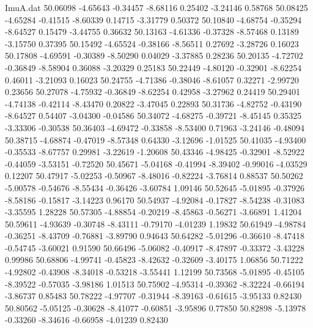 \begin{filecontents}{ImuA.dat}
  50.06098   -4.65643   -0.34457   -8.68116    0.25402   -3.24146    0.58768
  50.08425   -4.65284   -0.41515   -8.60339    0.14715   -3.31779    0.50372
  50.10840   -4.68754   -0.35294   -8.64527    0.15479   -3.44755    0.36632
  50.13163   -4.61336   -0.37328   -8.57468    0.13189   -3.15750    0.37395
  50.15492   -4.65524   -0.38166   -8.56511    0.27692   -3.28726    0.16023
  50.17808   -4.69591   -0.30389   -8.50290    0.04029   -3.37885    0.28236
  50.20135   -4.72702   -0.36849   -8.58904    0.36088   -3.20329    0.25183
  50.22449   -4.80120   -0.32901   -8.62254    0.46011   -3.21093    0.16023
  50.24755   -4.71386   -0.38046   -8.61057    0.32271   -2.99720    0.23656
  50.27078   -4.75932   -0.36849   -8.62254    0.42958   -3.27962    0.24419
  50.29401   -4.74138   -0.42114   -8.43470    0.20822   -3.47045    0.22893
  50.31736   -4.82752   -0.43190   -8.64527    0.54407   -3.04300   -0.04586
  50.34072   -4.68275   -0.39721   -8.45145    0.35325   -3.33306   -0.30538
  50.36403   -4.69472   -0.33858   -8.53400    0.71963   -3.24146   -0.48094
  50.38715   -4.68874   -0.47019   -8.57348    0.64330   -3.12696   -1.01525
  50.41035   -4.93400   -0.35533   -8.67757    0.29981   -3.22619   -1.20608
  50.43346   -4.98425   -0.32901   -8.52922   -0.44059   -3.53151   -0.72520
  50.45671   -5.04168   -0.41994   -8.39402   -0.99016   -4.03529    0.12207
  50.47917   -5.02253   -0.50967   -8.48016   -0.82224   -3.76814    0.88537
  50.50262   -5.00578   -0.54676   -8.55434   -0.36426   -3.60784    1.09146
  50.52645   -5.01895   -0.37926   -8.58186   -0.15817   -3.14223    0.96170
  50.54937   -4.92084   -0.17827   -8.54238   -0.31083   -3.35595    1.28228
  50.57305   -4.88854   -0.20219   -8.45863   -0.56271   -3.66891    1.41204
  50.59611   -4.93639   -0.30748   -8.43111   -0.79170   -4.01239    1.19832
  50.61949   -4.98784   -0.36251   -8.43709   -0.76881   -3.89790    0.94643
  50.64282   -5.01296   -0.36610   -8.47418   -0.54745   -3.60021    0.91590
  50.66496   -5.06082   -0.40917   -8.47897   -0.33372   -3.43228    0.99986
  50.68806   -4.99741   -0.45823   -8.42632   -0.32609   -3.40175    1.06856
  50.71222   -4.92802   -0.43908   -8.34018   -0.53218   -3.55441    1.12199
  50.73568   -5.01895   -0.45105   -8.39522   -0.57035   -3.98186    1.01513
  50.75902   -4.95314   -0.39362   -8.32224   -0.66194   -3.86737    0.85483
  50.78222   -4.97707   -0.31944   -8.39163   -0.61615   -3.95133    0.82430
  50.80562   -5.05125   -0.30628   -8.41077   -0.60851   -3.95896    0.77850
  50.82898   -5.13978   -0.33260   -8.34616   -0.66958   -4.01239    0.82430

\end{filecontents}
